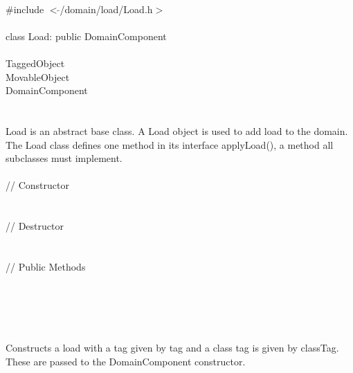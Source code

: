 
   \\
\indent \#include $<\tilde{ }$/domain/load/Load.h$>$  \\

  \\
\indent class Load: public DomainComponent  \\

 \\
\indent TaggedObject \\
\indent MovableObject \\
\indent\indent DomainComponent \\
\indent\indent{} \\

  \\
\indent Load is an abstract base class. A Load object is used to add
load to the domain. The Load class defines one method in its interface
applyLoad(), a method all subclasses must implement. \\


  \\
\indent // Constructor  \\
  \\ \\
\indent // Destructor  \\
 \\ \\
\indent // Public Methods   \\
 \\
\\
\\

  \\
  \\
Constructs a load with a tag given by \p tag and a class tag is
given by \p classTag. These are passed to the DomainComponent constructor. \\

  \\
 \\

